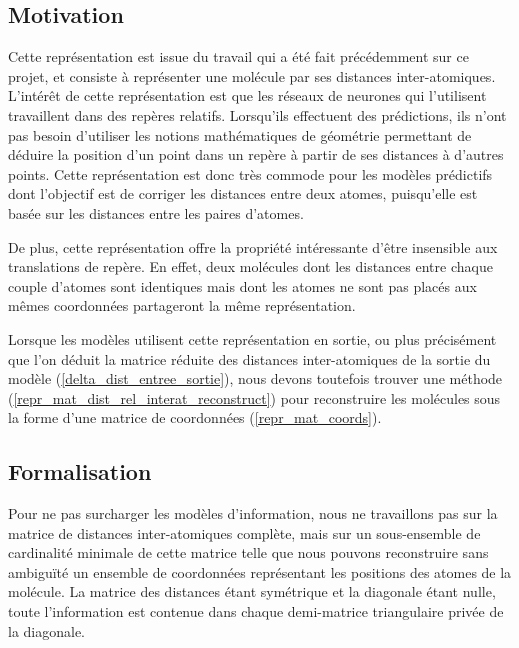 \label{repr_mat_red_dist_interat}

\subsection{Motivation}

\label{repr_mat_red_dist_interat_motiv}

\par Cette représentation est issue du travail qui a été fait précédemment sur ce projet, et consiste à représenter une molécule par ses distances inter-atomiques. L'intérêt de cette représentation est que les réseaux de neurones qui l'utilisent travaillent dans des repères relatifs. Lorsqu'ils effectuent des prédictions, ils n'ont pas besoin d'utiliser les notions mathématiques de géométrie permettant de déduire la position d'un point dans un repère à partir de ses distances à d'autres points. Cette représentation est donc très commode pour les modèles prédictifs dont l'objectif est de corriger les distances entre deux atomes, puisqu'elle est basée sur les distances entre les paires d'atomes.

\par De plus, cette représentation offre la propriété intéressante d'être insensible aux translations de repère. En effet, deux molécules dont les distances entre chaque couple d'atomes sont identiques mais dont les atomes ne sont pas placés aux mêmes coordonnées partageront la même représentation.\\

\par Lorsque les modèles utilisent cette représentation en sortie, ou plus précisément que l'on déduit la matrice réduite des distances inter-atomiques de la sortie du modèle (\ref{delta_dist_entree_sortie}), nous devons toutefois trouver une méthode (\ref{repr_mat_dist_rel_interat_reconstruct}) pour reconstruire les molécules sous la forme d'une matrice de coordonnées (\ref{repr_mat_coords}).

\subsection{Formalisation}

\par Pour ne pas surcharger les modèles d'information, nous ne travaillons pas sur la matrice de distances inter-atomiques complète, mais sur un sous-ensemble de cardinalité minimale de cette matrice telle que nous pouvons reconstruire sans ambiguïté un ensemble de coordonnées représentant les positions des atomes de la molécule. La matrice des distances étant symétrique et la diagonale étant nulle, toute l'information est contenue dans chaque demi-matrice triangulaire privée de la diagonale. \\

